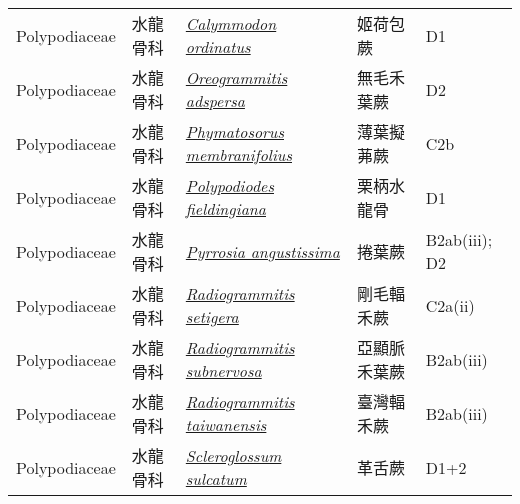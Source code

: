 {\begin{longtable}{p{2.5cm}p{2.5cm}p{4.5cm}p{2.5cm}p{3cm}}
    Polypodiaceae & 水龍骨科 & \href{http://www.theplantlist.org/tpl1.1/search?q=Calymmodon+ordinatus}{\textit{Calymmodon ordinatus} } & 姬荷包蕨 & D1 \index{Calymmodon@\textit{Calymmodon}!ordinatus@\textit{ordinatus}}  \index{姬荷包蕨} \\
    Polypodiaceae & 水龍骨科 & \href{http://www.theplantlist.org/tpl1.1/search?q=Oreogrammitis+adspersa}{\textit{Oreogrammitis adspersa} } & 無毛禾葉蕨 & D2 \index{Oreogrammitis@\textit{Oreogrammitis}!adspersa@\textit{adspersa}}  \index{無毛禾葉蕨} \\
    Polypodiaceae & 水龍骨科 & \href{http://www.theplantlist.org/tpl1.1/search?q=Phymatosorus+membranifolius}{\textit{Phymatosorus membranifolius} } & 薄葉擬茀蕨 & C2b \index{Phymatosorus@\textit{Phymatosorus}!membranifolius@\textit{membranifolius}}  \index{薄葉擬茀蕨} \\
    Polypodiaceae & 水龍骨科 & \href{http://www.theplantlist.org/tpl1.1/search?q=Polypodiodes+fieldingiana}{\textit{Polypodiodes fieldingiana} } & 栗柄水龍骨 & D1 \index{Polypodiodes@\textit{Polypodiodes}!fieldingiana@\textit{fieldingiana}}  \index{栗柄水龍骨} \\
    Polypodiaceae & 水龍骨科 & \href{http://www.theplantlist.org/tpl1.1/search?q=Pyrrosia+angustissima}{\textit{Pyrrosia angustissima} } & 捲葉蕨 & B2ab(iii); D2 \index{Pyrrosia@\textit{Pyrrosia}!angustissima@\textit{angustissima}}  \index{捲葉蕨} \\
    Polypodiaceae & 水龍骨科 & \href{http://www.theplantlist.org/tpl1.1/search?q=Radiogrammitis+setigera}{\textit{Radiogrammitis setigera} } & 剛毛輻禾蕨 & C2a(ii) \index{Radiogrammitis@\textit{Radiogrammitis}!setigera@\textit{setigera}}  \index{剛毛輻禾蕨} \\
    Polypodiaceae & 水龍骨科 & \href{http://www.theplantlist.org/tpl1.1/search?q=Radiogrammitis+subnervosa}{\textit{Radiogrammitis subnervosa} } & 亞顯脈禾葉蕨 & B2ab(iii) \index{Radiogrammitis@\textit{Radiogrammitis}!subnervosa@\textit{subnervosa}}  \index{亞顯脈禾葉蕨} \\
    Polypodiaceae & 水龍骨科 & \href{http://www.theplantlist.org/tpl1.1/search?q=Radiogrammitis+taiwanensis}{\textit{Radiogrammitis taiwanensis} } & 臺灣輻禾蕨 & B2ab(iii) \index{Radiogrammitis@\textit{Radiogrammitis}!taiwanensis@\textit{taiwanensis}}  \index{臺灣輻禾蕨} \\
    Polypodiaceae & 水龍骨科 & \href{http://www.theplantlist.org/tpl1.1/search?q=Scleroglossum+sulcatum}{\textit{Scleroglossum sulcatum} } & 革舌蕨 & D1+2 \index{Scleroglossum@\textit{Scleroglossum}!sulcatum@\textit{sulcatum}}  \index{革舌蕨} \\

\end{longtable}}
